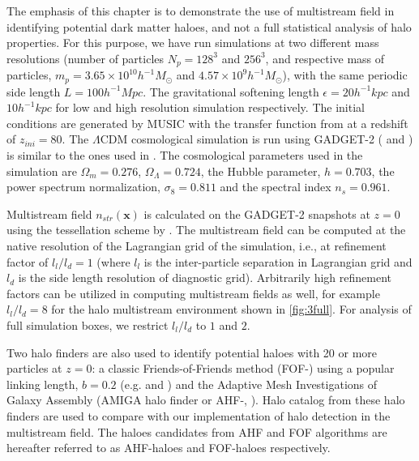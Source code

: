 The emphasis of this chapter is to demonstrate the use of multistream field in identifying potential dark matter haloes, and not a full statistical analysis of halo properties. For this purpose, we have run simulations at two different mass resolutions (number of particles $N_p = 128^3$ and $256^3$, and respective mass of particles, $m_p = 3.65 \times 10^{10} h^{-1} M_{\odot}$ and $ 4.57 \times 10^{9} h^{-1} M_{\odot}$), with the same periodic side length $L = 100 h^{-1} Mpc$. The gravitational softening length $\epsilon = 20 h^{-1} kpc$ and $10 h^{-1} kpc$ for low and high resolution simulation respectively. The initial conditions are generated by {MUSIC} \citep{Hahn2011a} with the transfer function from \cite{Eisenstein1998a} at a redshift of $z_{ini}= 80$. The $\Lambda$CDM cosmological simulation is run using {GADGET-2} (\citealt{Springel2005c} and \citealt{Springel2001}) is similar to the ones used in \cite{Ramachandra2017}. The cosmological parameters used in the simulation are $\Omega_{m}= 0.276$, $\Omega_{\Lambda}= 0.724$, the Hubble parameter, $h = 0.703$, the power spectrum normalization, $\sigma_8 = 0.811$ and the spectral index $n_s= 0.961$. 



Multistream field $n_{str}(\mathbf{x})$ is calculated on the GADGET-2 snapshots at $z=0$ using the tessellation scheme by \cite{Shandarin2012}. The multistream field can be computed at the native resolution of the Lagrangian grid of the simulation, i.e., at refinement factor of $l_l/l_d = 1$ (where $l_l$ is the inter-particle separation in Lagrangian grid and $l_d$ is the side length resolution of diagnostic grid). Arbitrarily high refinement factors can be utilized in computing multistream fields as well, for example  $l_l/l_d = 8$ for the halo multistream environment shown in \autoref{fig:3full}. For analysis of full simulation boxes, we restrict $l_l/l_d$ to $1$ and $2$. 

Two halo finders are also used to identify potential haloes with 20 or more particles at $z= 0$: a classic Friends-of-Friends method (FOF-\citealt{Davis1985}) using a popular linking length, $ b= 0.2$ (e.g. \citealt{Frenk1988} and \citealt{Lacey1994}) and the Adaptive Mesh Investigations of Galaxy Assembly (AMIGA halo finder or AHF-\citealt{Knollmann2009a}, \citealt{Gill2004a}). Halo catalog from these halo finders are used to compare with our implementation of halo detection in the multistream field. The haloes candidates from AHF and FOF algorithms are hereafter referred to as AHF-haloes and FOF-haloes respectively.




